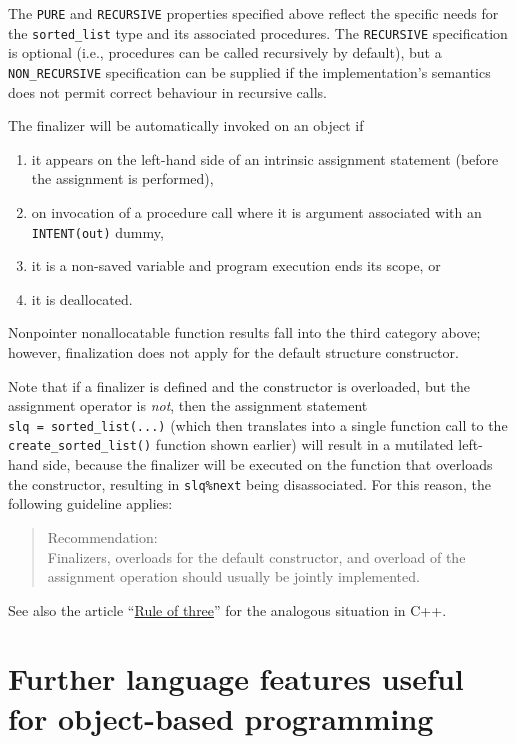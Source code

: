 \documentclass[
]{article}
\providecommand{\tightlist}{%
  \setlength{\itemsep}{0pt}\setlength{\parskip}{0pt}}
\begin{document}
The \texttt{PURE} and \texttt{RECURSIVE} properties specified above
reflect the specific needs for the \texttt{sorted\_list} type and its
associated procedures. The \texttt{RECURSIVE} specification is optional
(i.e., procedures can be called recursively by default), but a
\texttt{NON\_RECURSIVE} specification can be supplied if the
implementation's semantics does not permit correct behaviour in
recursive calls.

The finalizer will be automatically invoked on an object if

\begin{enumerate}
\def\labelenumi{\arabic{enumi}.}
\tightlist
\item
  it appears on the left-hand side of an intrinsic assignment statement
  (before the assignment is performed),
\item
  on invocation of a procedure call where it is argument associated with
  an \texttt{INTENT(out)} dummy,
\item
  it is a non-saved variable and program execution ends its scope, or
\item
  it is deallocated.
\end{enumerate}

Nonpointer nonallocatable function results fall into the third category
above; however, finalization does not apply for the default structure
constructor.

Note that if a finalizer is defined and the constructor is overloaded,
but the assignment operator is \emph{not}, then the assignment statement
\texttt{slq\ =\ sorted\_list(...)} (which then translates into a single
function call to the \texttt{create\_sorted\_list()} function shown
earlier) will result in a mutilated left-hand side, because the
finalizer will be executed on the function that overloads the
constructor, resulting in \texttt{slq\%next} being disassociated. For
this reason, the following guideline applies:

\begin{quote}
Recommendation:\\
Finalizers, overloads for the default constructor, and overload of the
assignment operation should usually be jointly implemented.
\end{quote}

See also the article
``\href{https://en.wikipedia.org/wiki/Rule_of_three_(C\%2B\%2B_programming)}{Rule
of three}'' for the analogous situation in C++.

\section{Further language features useful for object-based
programming}\label{further-language-features-useful-for-object-based-programming}
\end{document}
